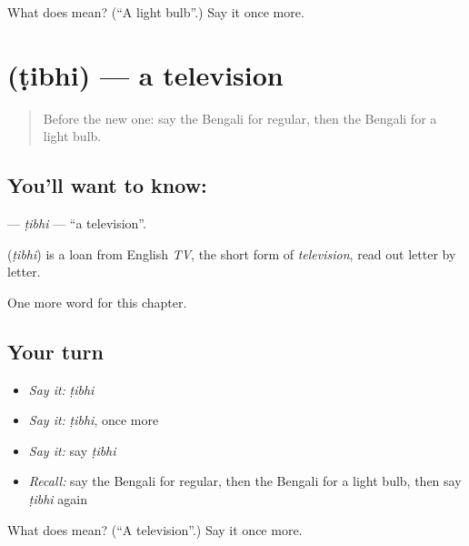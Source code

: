 \begin{tcolorbox}[breakable,colback=teal!4,colframe=teal!35!black,title={Before you move on}]
What does  mean? (\textquotedblleft{}A light bulb\textquotedblright{}.) Say it once more.
\end{tcolorbox}
\section[\texorpdfstring{\bn{টিভি} (ṭibhi)}{টিভি (ṭibhi)}]{ (ṭibhi) — a television}

\label{lesson:BN-C222-tibhi}



\begin{quote}
Before the new one: say the Bengali for regular, then the Bengali for a light bulb.
\end{quote}

\subsection*{You'll want to know: }
\textbf{} — \emph{ṭibhi} — \textquotedblleft{}a television\textquotedblright{}.

\begin{cousinweb}
\textbf{} (\emph{ṭibhi}) is a loan from English \emph{TV}, the short form of \emph{television}, read out letter by letter.
\end{cousinweb}

\begin{grammarlens}[title={What you've built}]
One more word for this chapter.
\end{grammarlens}

\subsection*{Your turn}
\begin{itemize}
\raggedright
  \item \emph{Say it:} \emph{ṭibhi}
  \item \emph{Say it:} \emph{ṭibhi}, once more
  \item \emph{Say it:} say \emph{ṭibhi}
  \item \emph{Recall:} say the Bengali for regular, then the Bengali for a light bulb, then say \emph{ṭibhi} again
\end{itemize}

\begin{tcolorbox}[breakable,colback=teal!4,colframe=teal!35!black,title={Before you move on}]
What does  mean? (\textquotedblleft{}A television\textquotedblright{}.) Say it once more.
\end{tcolorbox}
